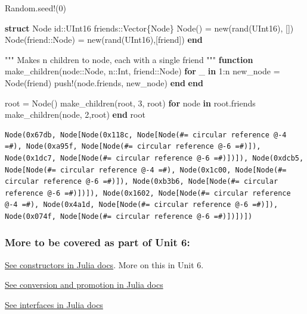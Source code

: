 \documentclass[
]{article}
\newenvironment{Shaded}{\begin{snugshade}}{\end{snugshade}}
\newcommand{\BuiltInTok}[1]{\textcolor[rgb]{0.00,0.23,0.31}{#1}}
\newcommand{\ControlFlowTok}[1]{\textcolor[rgb]{0.00,0.23,0.31}{\textbf{#1}}}
\newcommand{\DataTypeTok}[1]{\textcolor[rgb]{0.68,0.00,0.00}{#1}}
\newcommand{\FloatTok}[1]{\textcolor[rgb]{0.68,0.00,0.00}{#1}}
\newcommand{\FunctionTok}[1]{\textcolor[rgb]{0.28,0.35,0.67}{#1}}
\newcommand{\KeywordTok}[1]{\textcolor[rgb]{0.00,0.23,0.31}{\textbf{#1}}}
\newcommand{\NormalTok}[1]{\textcolor[rgb]{0.00,0.23,0.31}{#1}}
\newcommand{\OperatorTok}[1]{\textcolor[rgb]{0.37,0.37,0.37}{#1}}
\newcommand{\StringTok}[1]{\textcolor[rgb]{0.13,0.47,0.30}{#1}}
\begin{document}
\begin{Shaded}
\begin{Highlighting}[]
\BuiltInTok{Random}\NormalTok{.}\FunctionTok{seed!}\NormalTok{(}\FloatTok{0}\NormalTok{)}

\KeywordTok{struct}\NormalTok{ Node}
\NormalTok{   id}\OperatorTok{::}\DataTypeTok{UInt16}
\NormalTok{   friends}\OperatorTok{::}\DataTypeTok{Vector\{Node\}}
   \FunctionTok{Node}\NormalTok{() }\OperatorTok{=} \FunctionTok{new}\NormalTok{(}\FunctionTok{rand}\NormalTok{(}\DataTypeTok{UInt16}\NormalTok{), [])}
   \FunctionTok{Node}\NormalTok{(friend}\OperatorTok{::}\DataTypeTok{Node}\NormalTok{) }\OperatorTok{=} \FunctionTok{new}\NormalTok{(}\FunctionTok{rand}\NormalTok{(}\DataTypeTok{UInt16}\NormalTok{),[friend])}
\KeywordTok{end}

\StringTok{"""}
\StringTok{Makes \textquotesingle{}n\textasciigrave{} children to node, each with a single friend}
\StringTok{"""}
\KeywordTok{function} \FunctionTok{make\_children}\NormalTok{(node}\OperatorTok{::}\DataTypeTok{Node}\NormalTok{, n}\OperatorTok{::}\DataTypeTok{Int}\NormalTok{, friend}\OperatorTok{::}\DataTypeTok{Node}\NormalTok{)}
   \ControlFlowTok{for}\NormalTok{ \_ }\KeywordTok{in} \FloatTok{1}\OperatorTok{:}\NormalTok{n}
\NormalTok{   new\_node }\OperatorTok{=} \FunctionTok{Node}\NormalTok{(friend)}
   \FunctionTok{push!}\NormalTok{(node.friends, new\_node)}
   \ControlFlowTok{end}
\KeywordTok{end}

\NormalTok{root }\OperatorTok{=} \FunctionTok{Node}\NormalTok{()}
\FunctionTok{make\_children}\NormalTok{(root, }\FloatTok{3}\NormalTok{, root)}
\ControlFlowTok{for}\NormalTok{ node }\KeywordTok{in}\NormalTok{ root.friends}
   \FunctionTok{make\_children}\NormalTok{(node, }\FloatTok{2}\NormalTok{,root)}
\ControlFlowTok{end}
\NormalTok{root}
\end{Highlighting}
\end{Shaded}

\begin{verbatim}
Node(0x67db, Node[Node(0x118c, Node[Node(#= circular reference @-4 =#), Node(0xa95f, Node[Node(#= circular reference @-6 =#)]), Node(0x1dc7, Node[Node(#= circular reference @-6 =#)])]), Node(0xdcb5, Node[Node(#= circular reference @-4 =#), Node(0x1c00, Node[Node(#= circular reference @-6 =#)]), Node(0xb3b6, Node[Node(#= circular reference @-6 =#)])]), Node(0x1602, Node[Node(#= circular reference @-4 =#), Node(0x4a1d, Node[Node(#= circular reference @-6 =#)]), Node(0x074f, Node[Node(#= circular reference @-6 =#)])])])
\end{verbatim}

\subsubsection{More to be covered as part of Unit
6:}\label{more-to-be-covered-as-part-of-unit-6}

\href{https://docs.julialang.org/en/v1/manual/constructors/}{See
constructors in Julia docs}. More on this in Unit 6.

\href{https://docs.julialang.org/en/v1/manual/conversion-and-promotion/}{See
conversion and promotion in Julia docs}

\href{https://docs.julialang.org/en/v1/manual/interfaces/}{See
interfaces in Julia docs}
\end{document}
